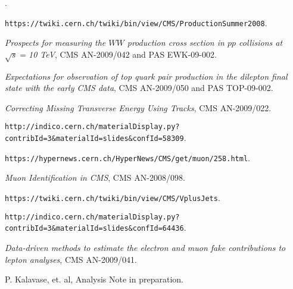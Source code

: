 \begin{thebibliography}{99}

.

 {\tt https://twiki.cern.ch/twiki/bin/view/CMS/ProductionSummer2008}.

 {\it Prospects for measuring the $WW$ production cross section in $pp$ collisions at $\sqrt s = $10 TeV}, CMS AN-2009/042 and PAS EWK-09-002.

 {\it Expectations for observation of top quark pair production in the dilepton final state with the early CMS data}, CMS AN-2009/050 and PAS TOP-09-002.

 {\it Correcting Missing Transverse Energy Using Tracks}, CMS AN-2009/022.

 {\tt http://indico.cern.ch/materialDisplay.py?contribId=3\&materialId=slides\&confId=58309}.

 {\tt https://hypernews.cern.ch/HyperNews/CMS/get/muon/258.html}.

 {\it Muon Identification in CMS}, CMS AN-2008/098.

 {\tt https://twiki.cern.ch/twiki/bin/view/CMS/VplusJets}.

 {\tt http://indico.cern.ch/materialDisplay.py?contribId=3\&materialId=slides\&confId=64436}.

 {\it Data-driven methods to estimate the electron and muon fake contributions to lepton analyses}, CMS AN-2009/041.

 P. Kalavase, et. al, Analysis Note in preparation.

\end{thebibliography}








